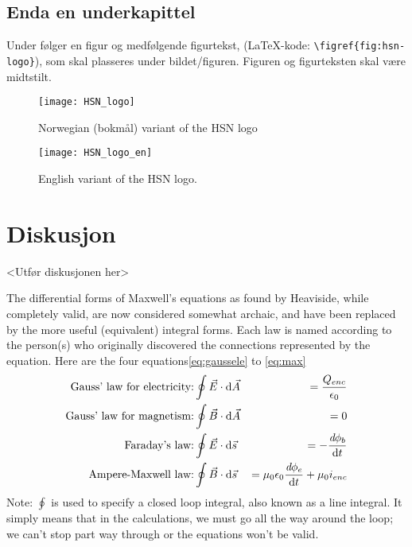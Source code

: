\documentclass[%
norsk,  %
]{USN-BSc}
\begin{document}
\section{Enda en underkapittel}
\label{sec:endaunderkappittel}

Under følger en figur og medfølgende figurtekst,  (\LaTeX-kode: \verb#\figref{fig:hsn-logo}#), som skal plasseres under bildet/figuren. Figuren og figurteksten skal være midtstilt.

\begin{figure}[!ht]
  \centering
  \texttt{[image: HSN\_logo]}
  \caption{Norwegian (bokmål) variant of the HSN logo}
  \label{fig:hsn-logo}
\end{figure}

\lipsum

\begin{figure}[!ht]
  \centering
  \texttt{[image: HSN\_logo\_en]}
  \caption{English variant of the HSN logo.}
  \label{fig:hsn-logo-en}
\end{figure}

\lipsum[9]

\chapter{Diskusjon}
\label{sec:diskusjon}

<Utfør diskusjonen her>

The differential forms of Maxwell's equations as found by Heaviside, while completely valid, are now considered somewhat archaic, and have been replaced by the more useful (equivalent) integral forms. Each law is named according to the person(s) who originally discovered the connections represented by the equation. Here are the four equations\eqref{eq:gaussele} to \eqref{eq:max}
\begin{eqnarray}
  \text{Gauss' law for electricity:}& \displaystyle \oint{\vec{E}\cdot\mathrm{d}\vec{A}}&=\frac{Q_{enc}}{\epsilon_0}\label{eq:gaussele}\\
  \text{Gauss' law for magnetism:}& \displaystyle \oint{\vec{B}\cdot\mathrm{d}\vec{A}}&=0\label{eq:gaussmag}\\
  \text{Faraday's law:}& \displaystyle\oint{\vec{E}\cdot\mathrm{d}\vec{s}}&=-\frac{\emph{d}\phi_b}{\mathrm{d}t}\label{eq:fara}\\
  \text{Ampere-Maxwell law:}& \displaystyle\oint{\vec{B}\cdot\mathrm{d}\vec{s}}&=\mu_0\epsilon_0\frac{\emph{d}\phi_e}{\mathrm{d}t}+\mu_0 i_{enc}\label{eq:max}
\end{eqnarray}
Note: $\oint$ is used to specify a closed loop integral, also known as a line integral. It simply means that in the calculations, we must go all the way around the loop; we can't stop part way through or the equations won't be valid.
\end{document}
